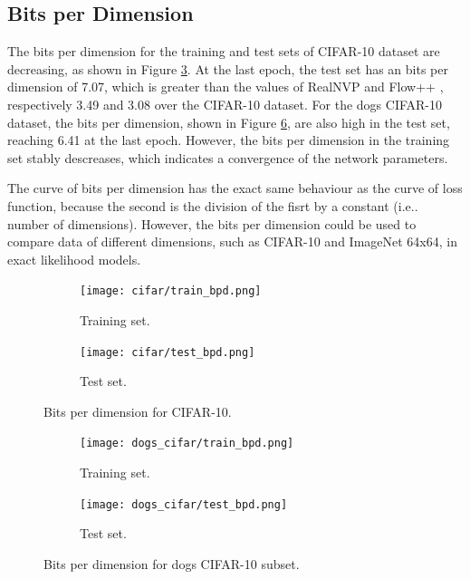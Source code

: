 \documentclass{article}
\makeatletter
\DeclareRobustCommand\onedot{\futurelet\@let@token\@onedot}
\def\@onedot{\ifx\@let@token.\else.\null\fi\xspace}
\def\ie{i.e\onedot} \def\Ie{I.e\onedot}
\makeatother
\begin{document}
\subsection{Bits per Dimension}

The bits per dimension for the training and test sets of CIFAR-10 dataset are decreasing, as shown in Figure \ref{fig:cifarBpd}. At the last epoch, the test set has an bits per dimension of 7.07, which is greater than the values of RealNVP and Flow++ \cite{ho2019flow++}, respectively 3.49 and 3.08 over the CIFAR-10 dataset. For the dogs CIFAR-10 dataset, the bits per dimension, shown in Figure \ref{fig:dogsBpd}, are also high in the test set, reaching 6.41 at the last epoch. However, the bits per dimension in the training set stably descreases, which indicates a convergence of the network parameters.

The curve of bits per dimension has the exact same behaviour as the curve of loss function, because the second is the division of the fisrt by a constant (\ie number of dimensions). However, the bits per dimension could be used to compare data of different dimensions, such as CIFAR-10 and ImageNet 64x64, in exact likelihood models.

\begin{figure}
  \begin{subfigure}[t]{0.49\textwidth}
    \centering
    \texttt{[image: cifar/train\_bpd.png]}
    \caption{Training set.}
    \label{fig:cifarTrainBpd}
  \end{subfigure}
  \hfill
  \begin{subfigure}[t]{0.49\textwidth}
    \centering
    \texttt{[image: cifar/test\_bpd.png]}
    \caption{Test set.}
    \label{fig:cifarTestBpd}
  \end{subfigure}
  \caption{Bits per dimension for CIFAR-10.}
  \label{fig:cifarBpd}
\end{figure}

\begin{figure}
  \begin{subfigure}[t]{0.49\textwidth}
    \centering
    \texttt{[image: dogs\_cifar/train\_bpd.png]}
    \caption{Training set.}
    \label{fig:dogsTrainBpd}
  \end{subfigure}
  \hfill
  \begin{subfigure}[t]{0.49\textwidth}
    \centering
    \texttt{[image: dogs\_cifar/test\_bpd.png]}
    \caption{Test set.}
    \label{fig:dogsTestBpd}
  \end{subfigure}
  \caption{Bits per dimension for dogs CIFAR-10 subset.}
  \label{fig:dogsBpd}
\end{figure}
\end{document}
